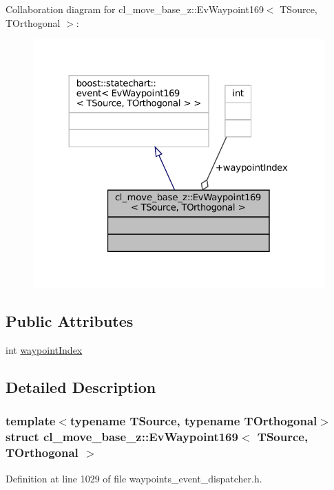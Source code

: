 Collaboration diagram for cl\+\_\+move\+\_\+base\+\_\+z\+:\+:Ev\+Waypoint169$<$ T\+Source, T\+Orthogonal $>$\+:
\nopagebreak
\begin{figure}[H]
\begin{center}
\leavevmode
\includegraphics[width=324pt]{structcl__move__base__z_1_1EvWaypoint169__coll__graph}
\end{center}
\end{figure}
\subsection*{Public Attributes}
\begin{DoxyCompactItemize}
\item 
int \hyperlink{structcl__move__base__z_1_1EvWaypoint169_a3b6af50ccb8417eb44941e157f3fcaa2}{waypoint\+Index}
\end{DoxyCompactItemize}


\subsection{Detailed Description}
\subsubsection*{template$<$typename T\+Source, typename T\+Orthogonal$>$\newline
struct cl\+\_\+move\+\_\+base\+\_\+z\+::\+Ev\+Waypoint169$<$ T\+Source, T\+Orthogonal $>$}



Definition at line 1029 of file waypoints\+\_\+event\+\_\+dispatcher.\+h.



